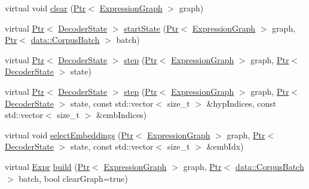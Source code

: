 \begin{DoxyCompactItemize}
virtual void \hyperlink{classmarian_1_1EncoderDecoder_ad42d2109d87d2bd25da7f1a6bb72777c}{clear} (\hyperlink{namespacemarian_ad1a373be43a00ef9ce35666145137b08}{Ptr}$<$ \hyperlink{classmarian_1_1ExpressionGraph}{Expression\+Graph} $>$ graph)
\item 
virtual \hyperlink{namespacemarian_ad1a373be43a00ef9ce35666145137b08}{Ptr}$<$ \hyperlink{classmarian_1_1DecoderState}{Decoder\+State} $>$ \hyperlink{classmarian_1_1EncoderDecoder_ad4e4f2b699812b5e082ebc10f31ab433}{start\+State} (\hyperlink{namespacemarian_ad1a373be43a00ef9ce35666145137b08}{Ptr}$<$ \hyperlink{classmarian_1_1ExpressionGraph}{Expression\+Graph} $>$ graph, \hyperlink{namespacemarian_ad1a373be43a00ef9ce35666145137b08}{Ptr}$<$ \hyperlink{classmarian_1_1data_1_1CorpusBatch}{data\+::\+Corpus\+Batch} $>$ batch)
\item 
virtual \hyperlink{namespacemarian_ad1a373be43a00ef9ce35666145137b08}{Ptr}$<$ \hyperlink{classmarian_1_1DecoderState}{Decoder\+State} $>$ \hyperlink{classmarian_1_1EncoderDecoder_a558f6af38685965b966512478de18c4b}{step} (\hyperlink{namespacemarian_ad1a373be43a00ef9ce35666145137b08}{Ptr}$<$ \hyperlink{classmarian_1_1ExpressionGraph}{Expression\+Graph} $>$ graph, \hyperlink{namespacemarian_ad1a373be43a00ef9ce35666145137b08}{Ptr}$<$ \hyperlink{classmarian_1_1DecoderState}{Decoder\+State} $>$ state)
\item 
virtual \hyperlink{namespacemarian_ad1a373be43a00ef9ce35666145137b08}{Ptr}$<$ \hyperlink{classmarian_1_1DecoderState}{Decoder\+State} $>$ \hyperlink{classmarian_1_1EncoderDecoder_a971e6d5f8523616276087416cdcb1a18}{step} (\hyperlink{namespacemarian_ad1a373be43a00ef9ce35666145137b08}{Ptr}$<$ \hyperlink{classmarian_1_1ExpressionGraph}{Expression\+Graph} $>$ graph, \hyperlink{namespacemarian_ad1a373be43a00ef9ce35666145137b08}{Ptr}$<$ \hyperlink{classmarian_1_1DecoderState}{Decoder\+State} $>$ state, const std\+::vector$<$ size\+\_\+t $>$ \&hyp\+Indices, const std\+::vector$<$ size\+\_\+t $>$ \&emb\+Indices)
\item 
virtual void \hyperlink{classmarian_1_1EncoderDecoder_a1375c25eceae2e904b9ef43397f9ea1c}{select\+Embeddings} (\hyperlink{namespacemarian_ad1a373be43a00ef9ce35666145137b08}{Ptr}$<$ \hyperlink{classmarian_1_1ExpressionGraph}{Expression\+Graph} $>$ graph, \hyperlink{namespacemarian_ad1a373be43a00ef9ce35666145137b08}{Ptr}$<$ \hyperlink{classmarian_1_1DecoderState}{Decoder\+State} $>$ state, const std\+::vector$<$ size\+\_\+t $>$ \&emb\+Idx)
\item 
virtual \hyperlink{namespacemarian_a498d8baf75b754011078b890b39c8e12}{Expr} \hyperlink{classmarian_1_1EncoderDecoder_a859d35d8ad42e6de1f8a55d5efa9b998}{build} (\hyperlink{namespacemarian_ad1a373be43a00ef9ce35666145137b08}{Ptr}$<$ \hyperlink{classmarian_1_1ExpressionGraph}{Expression\+Graph} $>$ graph, \hyperlink{namespacemarian_ad1a373be43a00ef9ce35666145137b08}{Ptr}$<$ \hyperlink{classmarian_1_1data_1_1CorpusBatch}{data\+::\+Corpus\+Batch} $>$ batch, bool clear\+Graph=true)

\end{DoxyCompactItemize}
